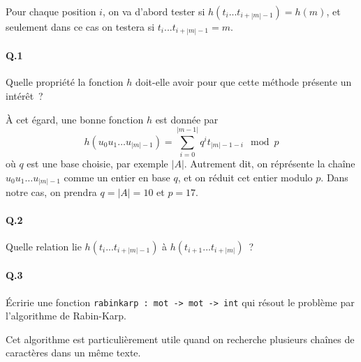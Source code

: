 \documentclass[10pt,a4paper]{article}
\begin{document}
Pour chaque position $i$, on va d'abord tester si $h(t_i...t_{i+|m|-1}) = h(m)$, et
seulement dans ce cas on testera si $t_i...t_{i+|m|-1} = m$.
\paragraph{Q.1} Quelle propriété la fonction $h$ doit-elle avoir pour que cette 
méthode présente un intérêt~?

À cet égard, une bonne fonction $h$ est donnée par
\[h(u_0u_1\dots u_{|m|-1}) = \sum_{i=0}^{|m-1|} q^i t_{|m|-1-i} \mod p\]
où $q$ est une base choisie, par exemple $|A|$. Autrement dit, on réprésente la
chaîne $u_0u_1\dots u_{|m|-1}$ comme un entier en base $q$, et on réduit cet 
entier modulo $p$. Dans notre cas, on prendra $q=|A|=10$ et $p=17$.
\paragraph{Q.2} Quelle relation lie $h(t_i...t_{i+|m|-1})$ 
à $h(t_{i+1}...t_{i+|m|})$~?
\paragraph{Q.3} Écririe une fonction \texttt{rabinkarp : mot -> mot -> int} qui 
résout le problème par l'algorithme de Rabin-Karp.

Cet algorithme est particulièrement utile quand on recherche plusieurs chaînes 
de caractères dans un même texte.
\end{document}
